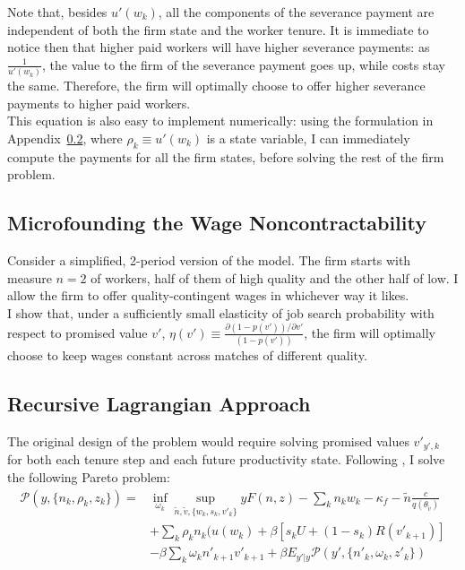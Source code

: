 Note that, besides $u'(w_k)$, all the components of the severance payment are independent of both the firm state and the worker tenure. 
It is immediate to notice then that higher paid workers will have higher severance payments: as $\frac{1}{u'(w_k)}$, the value to the firm of the severance payment goes up, while costs stay the same. Therefore, the firm will optimally choose to offer higher severance payments to higher paid workers. \\
This equation is also easy to implement numerically: using the formulation in Appendix~\ref{dual}, where $\rho_k\equiv u'(w_k)$ is a state variable, I can immediately compute the payments for all the firm states, before solving the rest of the firm problem.
\subsection{Microfounding the Wage Noncontractability} \label{microfoundation}
Consider a simplified, 2-period version of the model. The firm starts with measure $n=2$ of workers, half of them of high quality and the other half of low. I allow the firm to offer quality-contingent wages in whichever way it likes. \\
I show that, under a sufficiently small elasticity of job search probability with respect to promised value $v'$, $\eta(v')\equiv\frac{\partial (1-p(v')) /\partial v'}{(1-p(v'))}$, the firm will optimally choose to keep wages constant across matches of different quality.
\subsection{Recursive Lagrangian Approach} \label{dual}
The original design of the problem would require solving promised values $v'_{y',k}$ for both each tenure step and each future productivity state. Following \textcite{balke2022}, I solve the following Pareto problem:
\begin{equation*}
\begin{split}
\mathcal{P}(y,\{n_k,\rho_k,z_k\}) = &\inf_{\omega_k} \sup_{\tilde{n},\tilde{v},\{w_k,s_k,v'_k\}}  yF(n,z) - \sum_k n_kw_k - \kappa_f - \tilde{n}\frac{c}{q(\theta_{\tilde{v}})}   \\
& + \sum_k\rho_kn_k(u(w_k)+\beta[s_kU+(1-s_k)R(v'_{k+1})] \\
& -\beta\sum_k \omega_kn'_{k+1} v'_{k+1}+\beta E_{y'|y}\mathcal{P}(y',\{n'_k,\omega_k,z'_k\})    
\end{split}
\end{equation*}

